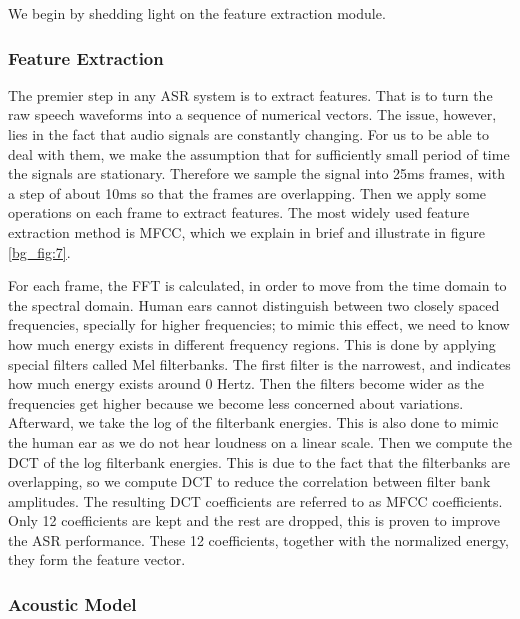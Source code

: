We begin by shedding light on the feature extraction module.


\subsubsection{Feature Extraction} 
\label{bg:s3_sub1_subsub1}



The premier step in any \ac{ASR} system is to extract features. That is to turn the raw speech waveforms into a sequence of numerical vectors. The issue, however, lies in the fact that audio signals are constantly changing. For us to be able to deal with them, we make the assumption that for sufficiently small period of time the signals are stationary. Therefore we sample the signal into 25ms frames, with a step of about 10ms so that the frames are overlapping. Then we apply some operations on each frame to extract features. The most widely used feature extraction method is \ac{MFCC}, which we explain in brief and illustrate in figure \ref{bg_fig:7}.

For each frame, the \ac{FFT} is calculated, in order to move from the time domain to the spectral domain. Human ears cannot distinguish between two closely spaced frequencies, specially for higher frequencies; to mimic this effect, we need to know how much energy exists in different frequency regions. This is done by applying special filters called Mel filterbanks. The first filter is the narrowest, and indicates how much energy exists around 0 Hertz. Then the filters become wider as the frequencies get higher because we become less concerned about variations. 
Afterward, we take the log of the filterbank energies. This is also done to mimic the human ear as we do not hear loudness on a linear scale. 
Then we compute the \ac{DCT} of the log filterbank energies. This is due to the fact that the filterbanks are overlapping, so we compute \ac{DCT} to reduce the correlation between filter bank amplitudes. The resulting \ac{DCT} coefficients are referred to as MFCC coefficients. Only 12 coefficients are kept and the rest are dropped, this is proven to improve the \ac{ASR} performance. These 12 coefficients, together with the normalized energy, they form the feature vector.

\subsubsection{Acoustic Model} 
\label{bg:s3_sub1_subsub2}

